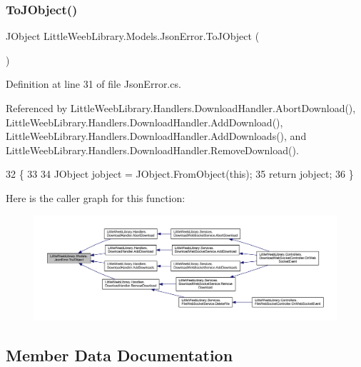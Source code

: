 \subsubsection{\texorpdfstring{To\+J\+Object()}{ToJObject()}}
{\footnotesize\ttfamily J\+Object Little\+Weeb\+Library.\+Models.\+Json\+Error.\+To\+J\+Object (\begin{DoxyParamCaption}{ }\end{DoxyParamCaption})}



Definition at line 31 of file Json\+Error.\+cs.



Referenced by Little\+Weeb\+Library.\+Handlers.\+Download\+Handler.\+Abort\+Download(), Little\+Weeb\+Library.\+Handlers.\+Download\+Handler.\+Add\+Download(), Little\+Weeb\+Library.\+Handlers.\+Download\+Handler.\+Add\+Downloads(), and Little\+Weeb\+Library.\+Handlers.\+Download\+Handler.\+Remove\+Download().


\begin{DoxyCode}
32         \{
33 
34             JObject jobject = JObject.FromObject(\textcolor{keyword}{this});
35             \textcolor{keywordflow}{return} jobject;
36         \}
\end{DoxyCode}
Here is the caller graph for this function\+:\nopagebreak
\begin{figure}[H]
\begin{center}
\leavevmode
\includegraphics[width=350pt]{class_little_weeb_library_1_1_models_1_1_json_error_a0623b835bb68d5d5e1f591df6a09dd81_icgraph}
\end{center}
\end{figure}


\subsection{Member Data Documentation}
\mbox{\label{class_little_weeb_library_1_1_models_1_1_json_error_a25ed286f6616ff3a708a5e2d1cbbc492}} 
